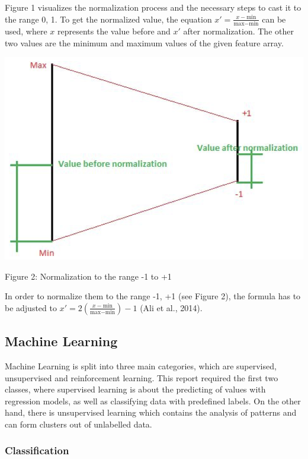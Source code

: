 \documentclass{article}
\begin{document}
\begin{multicols}{2}
Figure 1 visualizes the normalization process and the necessary steps to cast it to the range 0, 1. To get the normalized value, the equation \(x' = \frac{x - \text{min}}{\text{max} - \text{min}}\) can be used, where \(x\) represents the value before and \(x'\) after normalization. The other two values are the minimum and maximum values of the given feature array.

\includegraphics[scale=.35]{img/norm2.png}

{\small
  Figure 2: Normalization to the range -1 to +1
  \par
  \vspace{6pt}
}


In order to normalize them to the range -1, +1 (see Figure 2), the formula has to be adjusted to \(x' = 2 \left( \frac{x - \text{min}}{\text{max} - \text{min}} \right) - 1\) (Ali et al., 2014).


\subsection{Machine Learning}

Machine Learning is split into three main categories, which are supervised, unsupervised and reinforcement learning. This report required the first two classes, where supervised learning is about the predicting of values with regression models, as well as classifying data with predefined labels. On the other hand, there is unsupervised learning which contains the analysis of patterns and can form clusters out of unlabelled data.

\subsubsection{Classification}


\end{multicols}
\end{document}
